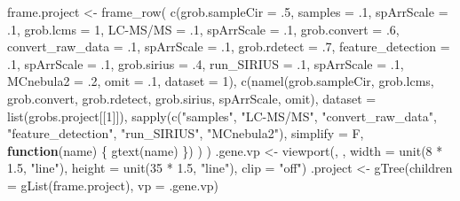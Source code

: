 \documentclass[
]{article}
\newenvironment{Shaded}{\begin{snugshade}}{\end{snugshade}}
\newcommand{\AttributeTok}[1]{\textcolor[rgb]{0.77,0.63,0.00}{#1}}
\newcommand{\ControlFlowTok}[1]{\textcolor[rgb]{0.13,0.29,0.53}{\textbf{#1}}}
\newcommand{\DecValTok}[1]{\textcolor[rgb]{0.00,0.00,0.81}{#1}}
\newcommand{\FloatTok}[1]{\textcolor[rgb]{0.00,0.00,0.81}{#1}}
\newcommand{\FunctionTok}[1]{\textcolor[rgb]{0.00,0.00,0.00}{#1}}
\newcommand{\NormalTok}[1]{#1}
\newcommand{\OtherTok}[1]{\textcolor[rgb]{0.56,0.35,0.01}{#1}}
\newcommand{\SpecialCharTok}[1]{\textcolor[rgb]{0.00,0.00,0.00}{#1}}
\newcommand{\StringTok}[1]{\textcolor[rgb]{0.31,0.60,0.02}{#1}}
\begin{document}
\begin{Shaded}
\begin{Highlighting}[]
\NormalTok{frame.project }\OtherTok{\textless{}{-}} \FunctionTok{frame\_row}\NormalTok{(}
  \FunctionTok{c}\NormalTok{(}\AttributeTok{grob.sampleCir =}\NormalTok{ .}\DecValTok{5}\NormalTok{, }\AttributeTok{samples =}\NormalTok{ .}\DecValTok{1}\NormalTok{, }\AttributeTok{spArrScale =}\NormalTok{ .}\DecValTok{1}\NormalTok{,}
    \AttributeTok{grob.lcms =} \DecValTok{1}\NormalTok{, }\StringTok{\textasciigrave{}}\AttributeTok{LC{-}MS/MS}\StringTok{\textasciigrave{}} \OtherTok{=}\NormalTok{ .}\DecValTok{1}\NormalTok{, }\AttributeTok{spArrScale =}\NormalTok{ .}\DecValTok{1}\NormalTok{,}
    \AttributeTok{grob.convert =}\NormalTok{ .}\DecValTok{6}\NormalTok{, }\AttributeTok{convert\_raw\_data =}\NormalTok{ .}\DecValTok{1}\NormalTok{, }\AttributeTok{spArrScale =}\NormalTok{ .}\DecValTok{1}\NormalTok{,}
    \AttributeTok{grob.rdetect =}\NormalTok{ .}\DecValTok{7}\NormalTok{, }\AttributeTok{feature\_detection =}\NormalTok{ .}\DecValTok{1}\NormalTok{, }\AttributeTok{spArrScale =}\NormalTok{ .}\DecValTok{1}\NormalTok{,}
    \AttributeTok{grob.sirius =}\NormalTok{ .}\DecValTok{4}\NormalTok{, }\AttributeTok{run\_SIRIUS =}\NormalTok{ .}\DecValTok{1}\NormalTok{, }\AttributeTok{spArrScale =}\NormalTok{ .}\DecValTok{1}\NormalTok{,}
    \AttributeTok{MCnebula2 =}\NormalTok{ .}\DecValTok{2}\NormalTok{, }\AttributeTok{omit =}\NormalTok{ .}\DecValTok{1}\NormalTok{, }\AttributeTok{dataset =} \DecValTok{1}\NormalTok{),}
  \FunctionTok{c}\NormalTok{(}\FunctionTok{namel}\NormalTok{(grob.sampleCir, grob.lcms, grob.convert, grob.rdetect,}
\NormalTok{      grob.sirius, spArrScale, omit),}
    \AttributeTok{dataset =} \FunctionTok{list}\NormalTok{(grobs.project[[}\DecValTok{1}\NormalTok{]]),}
    \FunctionTok{sapply}\NormalTok{(}\FunctionTok{c}\NormalTok{(}\StringTok{"samples"}\NormalTok{, }\StringTok{"LC{-}MS/MS"}\NormalTok{, }\StringTok{"convert\_raw\_data"}\NormalTok{,}
        \StringTok{"feature\_detection"}\NormalTok{, }\StringTok{"run\_SIRIUS"}\NormalTok{, }\StringTok{"MCnebula2"}\NormalTok{),}
      \AttributeTok{simplify =}\NormalTok{ F, }\ControlFlowTok{function}\NormalTok{(name) \{ }\FunctionTok{gtext}\NormalTok{(name) \})}
\NormalTok{  )}
\NormalTok{)}
\NormalTok{.gene.vp }\OtherTok{\textless{}{-}} \FunctionTok{viewport}\NormalTok{(, , }\AttributeTok{width =} \FunctionTok{unit}\NormalTok{(}\DecValTok{8} \SpecialCharTok{*} \FloatTok{1.5}\NormalTok{, }\StringTok{"line"}\NormalTok{),}
                     \AttributeTok{height =} \FunctionTok{unit}\NormalTok{(}\DecValTok{35} \SpecialCharTok{*} \FloatTok{1.5}\NormalTok{, }\StringTok{"line"}\NormalTok{), }\AttributeTok{clip =} \StringTok{"off"}\NormalTok{)}
\NormalTok{.project }\OtherTok{\textless{}{-}} \FunctionTok{gTree}\NormalTok{(}\AttributeTok{children =} \FunctionTok{gList}\NormalTok{(frame.project), }\AttributeTok{vp =}\NormalTok{ .gene.vp)}
\end{Highlighting}
\end{Shaded}
\end{document}
